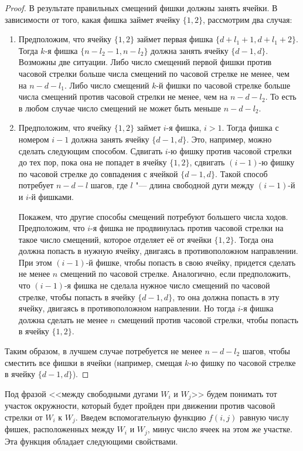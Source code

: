 \begin{proof}
	В результате правильных смещений фишки должны занять ячейки.
	В зависимости от того, какая фишка займет ячейку $\{1,2\}$, рассмотрим два случая:
	\begin{enumerate}
		\item Предположим, что ячейку $\{1,2\}$ займет первая фишка $\{d + l_1 + 1, d + l_1 + 2\}$. Тогда $k$-я фишка $\{n-l_2-1, n-l_2\}$ должна занять ячейку $\{d-1, d\}$. Возможны две ситуации. Либо число смещений первой фишки против часовой стрелки больше числа смещений по часовой стрелке не менее, чем на $n - d - l_1$. Либо число смещений $k$-й фишки по часовой стрелке больше числа смещений против часовой стрелки не менее, чем на $n - d - l_2$. То есть в любом случае число смещений не может быть меньше $n - d - l_2$.
		\item Предположим, что ячейку $\{1,2\}$ займет $i$-я фишка, $i > 1$. Тогда фишка с номером $i-1$ должна занять ячейку $\{d-1,d\}$. Это, например, можно сделать следующим способом. Сдвигать $i$-ю фишку против часовой стрелки до тех пор, пока она не попадет в ячейку $\{1,2\}$, сдвигать $(i-1)$-ю фишку по часовой стрелке до совпадения с ячейкой $\{d-1,d\}$. Такой способ потребует $n-d-l$ шагов, где $l$ "--- длина свободной дуги между $(i-1)$-й и $i$-й фишками. 
		
		Покажем, что другие способы смещений потребуют большего числа ходов. Предположим, что $i$-я фишка не продвинулась против часовой стрелки на такое число смещений, которое отделяет её от ячейки $\{1,2\}$. Тогда она должна попасть в нужную ячейку, двигаясь в противоположном направлении. При этом $(i-1)$-й фишке, чтобы попасть в свою ячейку, придется сделать не менее $n$ смещений по часовой стрелке. Аналогично, если предположить, что $(i-1)$-я фишка не сделала нужное число смещений по часовой стрелке, чтобы попасть в ячейку $\{d-1,d\}$, то она должна попасть в эту ячейку, двигаясь в противоположном направлении. Но тогда $i$-я фишка должна сделать не менее $n$ смещений против часовой стрелки, чтобы попасть в ячейку $\{1,2\}$.
	\end{enumerate}
	
	Таким образом, в лучшем случае потребуется не менее $n-d-l_2$ шагов, чтобы сместить все фишки в ячейки (например, смещая $k$-ю фишку по часовой стрелке в ячейку $\{d-1,d\}$).
\end{proof}

Под фразой <<между свободными дугами $W_i$ и $W_j$>> будем понимать тот участок окружности,
который будет пройден при движении против часовой стрелки от $W_i$ к $W_j$.
Введем вспомогательную функцию $f(i,j)$ равную числу фишек, 
расположенных между $W_i$ и $W_j$, минус число ячеек на этом же участке.
Эта функция обладает следующими свойствами.

